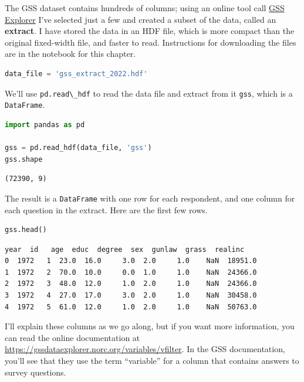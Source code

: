 The GSS dataset contains hundreds of columns; using an online tool call
\href{https://gssdataexplorer.norc.org/}{GSS Explorer} I've selected
just a few and created a subset of the data, called an \textbf{extract}.
I have stored the data in an HDF file, which is more compact than the
original fixed-width file, and faster to read. Instructions for
downloading the files are in the notebook for this chapter.

\begin{lstlisting}[language=Python,style=source]
data_file = 'gss_extract_2022.hdf'
\end{lstlisting}

We'll use \passthrough{\lstinline!pd.read\_hdf!} to read the data file
and extract from it \passthrough{\lstinline!gss!}, which is a
\passthrough{\lstinline!DataFrame!}.

\begin{lstlisting}[language=Python,style=source]
import pandas as pd

gss = pd.read_hdf(data_file, 'gss')
gss.shape
\end{lstlisting}

\begin{lstlisting}[style=output]
(72390, 9)
\end{lstlisting}

The result is a \passthrough{\lstinline!DataFrame!} with one row for
each respondent, and one column for each question in the extract. Here
are the first few rows.

\begin{lstlisting}[language=Python,style=source]
gss.head()
\end{lstlisting}

\begin{lstlisting}[style=output]
   year  id   age  educ  degree  sex  gunlaw  grass  realinc
0  1972   1  23.0  16.0     3.0  2.0     1.0    NaN  18951.0
1  1972   2  70.0  10.0     0.0  1.0     1.0    NaN  24366.0
2  1972   3  48.0  12.0     1.0  2.0     1.0    NaN  24366.0
3  1972   4  27.0  17.0     3.0  2.0     1.0    NaN  30458.0
4  1972   5  61.0  12.0     1.0  2.0     1.0    NaN  50763.0
\end{lstlisting}

I'll explain these columns as we go along, but if you want more
information, you can read the online documentation at
\url{https://gssdataexplorer.norc.org/variables/vfilter}. In the GSS
documentation, you'll see that they use the term ``variable'' for a
column that contains answers to survey questions.

